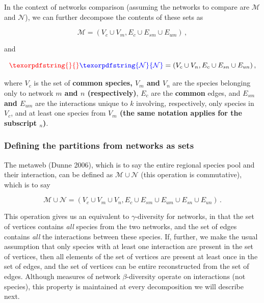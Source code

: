 \documentclass[11pt]{article}
\makeatletter
\def\maxwidth{\ifdim\Gin@nat@width>\linewidth\linewidth
\else\Gin@nat@width\fi}
\let\Oldincludegraphics\includegraphics
\renewcommand{\includegraphics}[1]{\Oldincludegraphics[width=\maxwidth]{#1}}
\providecommand{\DIFaddtex}[1]{{\bf #1}} %
\providecommand{\DIFdeltex}[1]{} %
\providecommand{\DIFaddbegin}{\protect\color{blue}} %
\providecommand{\DIFaddend}{\protect\color{black}} %
\providecommand{\DIFdelbegin}{\protect\color{red}} %
\providecommand{\DIFdelend}{\protect\color{black}} %
\providecommand{\DIFadd}[1]{\texorpdfstring{\DIFaddtex{#1}}{#1}} %
\providecommand{\DIFdel}[1]{\texorpdfstring{\DIFdeltex{#1}}{}} %
\newcommand{\DIFscaledelfig}{0.5}
\newlength{\DIFdelgraphicswidth} %
\newlength{\DIFdelgraphicsheight} %
\newcommand{\DIFaddincludegraphics}[2][]{{\color{blue}\fbox{\DIFOincludegraphics[#1]{#2}}}} %
\newcommand{\DIFdelincludegraphics}[2][]{%
\sbox{\DIFdelgraphicsbox}{\DIFOincludegraphics[#1]{#2}}%
\settoboxwidth{\DIFdelgraphicswidth}{\DIFdelgraphicsbox} %
\settoboxtotalheight{\DIFdelgraphicsheight}{\DIFdelgraphicsbox} %
\scalebox{\DIFscaledelfig}{%
\parbox[b]{\DIFdelgraphicswidth}{\usebox{\DIFdelgraphicsbox}\\[-\baselineskip] \rule{\DIFdelgraphicswidth}{0em}}\llap{\resizebox{\DIFdelgraphicswidth}{\DIFdelgraphicsheight}{%
\setlength{\unitlength}{\DIFdelgraphicswidth}%
\begin{picture}(1,1)%
\thicklines\linethickness{2pt} %
{\color[rgb]{1,0,0}\put(0,0){\framebox(1,1){}}}%
{\color[rgb]{1,0,0}\put(0,0){\line( 1,1){1}}}%
{\color[rgb]{1,0,0}\put(0,1){\line(1,-1){1}}}%
\end{picture}%
}\hspace*{3pt}}} %
} %
\DeclareRobustCommand{\DIFaddbegin}{\DIFOaddbegin \let\includegraphics\DIFaddincludegraphics} %
\DeclareRobustCommand{\DIFaddend}{\DIFOaddend \let\includegraphics\DIFOincludegraphics} %
\DeclareRobustCommand{\DIFdelbegin}{\DIFOdelbegin \let\includegraphics\DIFdelincludegraphics} %
\DeclareRobustCommand{\DIFdelend}{\DIFOaddend \let\includegraphics\DIFOincludegraphics} %
\makeatother
\begin{document}
In the context of networks comparison (assuming the networks to compare
are \(\mathcal{M}\) and \(\mathcal{N}\)), we can further decompose the
contents of these sets as

\[\mathcal{M} = (V_c \cup V_m, E_c \cup E_{sm} \cup E_{um}) \,,\]

and

\[\DIFdelbegin \DIFdel{\mathcal{M} }\DIFdelend \DIFaddbegin \DIFadd{\mathcal{N} }\DIFaddend = (V_c \cup V_n, E_c \cup E_{sn} \cup E_{un}) \,,\]

where \(V_c\) is the set of \DIFdelbegin \DIFdel{shared species, \(V_k\) }\DIFdelend \DIFaddbegin \DIFadd{common species, \(V_m\) and \(V_n\) }\DIFaddend are the
species belonging only to network \DIFdelbegin \DIFdel{\(k\)}\DIFdelend \DIFaddbegin \DIFadd{\(m\) and \(n\) (respectively)}\DIFaddend ,
\(E_c\) are the \DIFdelbegin \DIFdel{shared }\DIFdelend \DIFaddbegin \DIFadd{common }\DIFaddend edges, and \DIFdelbegin \DIFdel{\(E_{sk}\) and \(E_{uk}\) }\DIFdelend \DIFaddbegin \DIFadd{\(E_{sm}\) and \(E_{um}\) }\DIFaddend are the
interactions unique to \(k\) involving, respectively, only species in
\(V_c\), and at least one species from \DIFdelbegin \DIFdel{\(V_k\)}\DIFdelend \DIFaddbegin \DIFadd{\(V_m\) (the same notation
applies for the subscript \(_{n}\))}\DIFaddend .

\hypertarget{defining-the-partitions-from-networks-as-sets}{%
\subsubsection{Defining the partitions from networks as
sets}\label{defining-the-partitions-from-networks-as-sets}}

The metaweb (Dunne 2006), which is to say the entire regional species
pool and their interaction, can be defined as
\(\mathcal{M} \cup \mathcal{N}\) (this operation is commutative), which
is to say

\[\mathcal{M} \cup \mathcal{N} = (V_c \cup V_m \cup V_n, E_c \cup E_{sm} \cup E_{um} \cup E_{sn} \cup E_{un}) \,.\]

This operation gives us an equivalent to \(\gamma\)-diversity for
networks, in that the set of vertices contains \emph{all} species from
the two networks, and the set of edges contains \emph{all} the
interactions between these species. If, further, we make the usual
assumption that only species with at least one interaction are present
in the set of vertices, then all elements of the set of vertices are
present at least once in the set of edges, and the set of vertices can
be entire reconstructed from the set of edges. Although measures of
network \(\beta\)-diversity operate on interactions (not species), this
property is maintained at every decomposition we will describe next.
\end{document}
